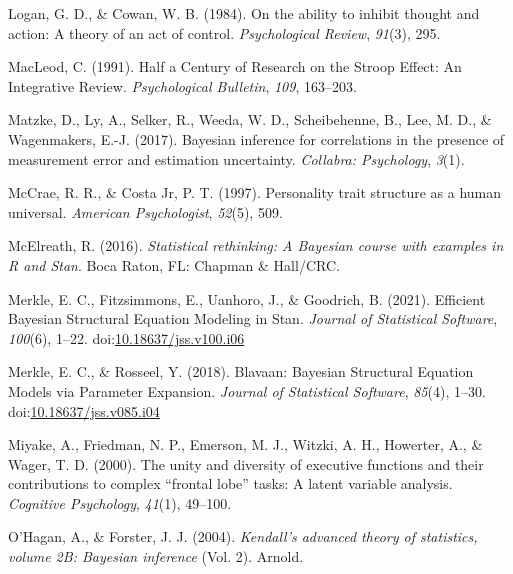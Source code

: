 \documentclass[
  ,man]{apa6}
\newlength{\cslhangindent}
\newlength{\cslentryspacingunit} %
\newenvironment{CSLReferences}[2] %
 {%
  \setlength{\parindent}{0pt}
  \ifodd #1
  \let\oldpar\par
  \def\par{\hangindent=\cslhangindent\oldpar}
  \fi
  \setlength{\parskip}{#2\cslentryspacingunit}
 }%
 {}
\begin{document}
\begin{CSLReferences}{1}{0}
\leavevmode{}%
Logan, G. D., \& Cowan, W. B. (1984). On the ability to inhibit thought and action: {A} theory of an act of control. \emph{Psychological Review}, \emph{91}(3), 295.

\leavevmode{}%
MacLeod, C. (1991). Half a {Century} of {Research} on the {Stroop Effect}: {An Integrative Review}. \emph{Psychological Bulletin}, \emph{109}, 163--203.

\leavevmode{}%
Matzke, D., Ly, A., Selker, R., Weeda, W. D., Scheibehenne, B., Lee, M. D., \& Wagenmakers, E.-J. (2017). Bayesian inference for correlations in the presence of measurement error and estimation uncertainty. \emph{Collabra: Psychology}, \emph{3}(1).

\leavevmode{}%
McCrae, R. R., \& Costa Jr, P. T. (1997). Personality trait structure as a human universal. \emph{American Psychologist}, \emph{52}(5), 509.

\leavevmode{}%
McElreath, R. (2016). \emph{Statistical rethinking: {A Bayesian} course with examples in {R} and {Stan}}. {Boca Raton, FL}: {Chapman \& Hall/CRC}.

\leavevmode{}%
Merkle, E. C., Fitzsimmons, E., Uanhoro, J., \& Goodrich, B. (2021). Efficient {Bayesian Structural Equation Modeling} in {Stan}. \emph{Journal of Statistical Software}, \emph{100}(6), 1--22. doi:\href{https://doi.org/10.18637/jss.v100.i06}{10.18637/jss.v100.i06}

\leavevmode{}%
Merkle, E. C., \& Rosseel, Y. (2018). Blavaan: {Bayesian Structural Equation Models} via {Parameter Expansion}. \emph{Journal of Statistical Software}, \emph{85}(4), 1--30. doi:\href{https://doi.org/10.18637/jss.v085.i04}{10.18637/jss.v085.i04}

\leavevmode{}%
Miyake, A., Friedman, N. P., Emerson, M. J., Witzki, A. H., Howerter, A., \& Wager, T. D. (2000). The unity and diversity of executive functions and their contributions to complex {``frontal lobe''} tasks: {A} latent variable analysis. \emph{Cognitive Psychology}, \emph{41}(1), 49--100.

\leavevmode{}%
O'Hagan, A., \& Forster, J. J. (2004). \emph{Kendall's advanced theory of statistics, volume {2B}: {Bayesian} inference} (Vol. 2). {Arnold}.


\end{CSLReferences}
\end{document}
